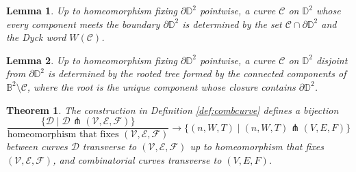 \documentclass[10pt,a4paper]{amsart}
\newtheorem{lemma}{Lemma}
\newtheorem{theorem}{Theorem}
\newcommand*{\bbB}{\mathbb{B}}
\newcommand*{\bbD}{\mathbb{D}}
\newcommand*{\calC}{\mathcal{C}}
\newcommand*{\calD}{\mathcal{D}}
\newcommand*{\calE}{\mathcal{E}}
\newcommand*{\calF}{\mathcal{F}}
\newcommand*{\calV}{\mathcal{V}}
\begin{document}
\begin{lemma}\label{lem:disk}
    Up to homeomorphism fixing $\partial\bbD^2$ pointwise, a curve $\calC$ on $\bbD^2$ whose every component meets the boundary $\partial\bbD^2$ is determined by the set $\calC\cap\partial\bbD^2$ and the Dyck word $W(\calC)$.
\end{lemma}

\begin{lemma}\label{lem:float}
    Up to homeomorphism fixing $\partial\bbD^2$ pointwise, a curve $\calC$ on $\bbD^2$ disjoint from $\partial\bbD^2$ is determined by the rooted tree formed by the connected components of $\bbB^2\setminus\calC$, where the root is the unique component whose closure contains $\partial\bbD^2$.
\end{lemma}

\begin{theorem}\label{thm:main}
    The construction in Definition \ref{def:combcurve} defines a bijection
    \begin{equation}\label{eq:main}
        \frac{\{\calD\mid\calD\pitchfork(\calV,\calE,\calF)\}}{\text{homeomorphism that fixes $(\calV,\calE,\calF)$}}\to\{(n,W,T)\mid(n,W,T)\pitchfork(V,E,F)\}
    \end{equation}
    between curves $\calD$ transverse to $(\calV,\calE,\calF)$ up to homeomorphism that fixes $(\calV,\calE,\calF)$, and combinatorial curves transverse to $(V,E,F)$.
\end{theorem}
\end{document}
